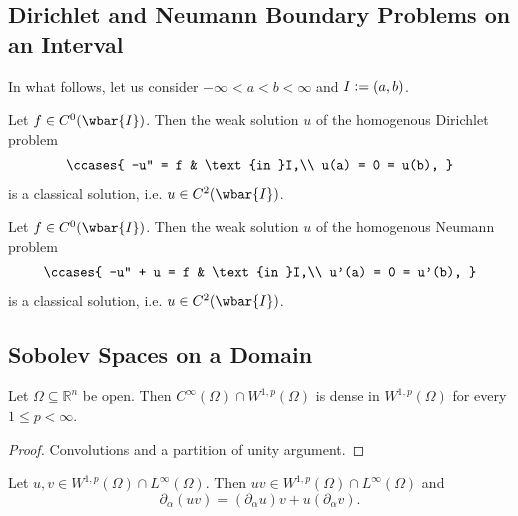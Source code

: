 \subsection*{Dirichlet and Neumann Boundary Problems on an Interval}
In what follows, let us consider $-\infty < a < b < \infty$ and $I := \intoo{a,b}$.

\begin{proposition}
	Let $f \in C^0(\wbar{I})$. Then the weak solution $u$ of the homogenous Dirichlet problem
	\begin{align*}
		\ccases{
			-u'' = f & \text{in }I,\\
			u(a) = 0 = u(b),
		}
	\end{align*}
	\noindent is a classical solution, i.e. $u \in C^2(\wbar{I})$.
\end{proposition}

\begin{proposition}
	Let $f \in C^0(\wbar{I})$. Then the weak solution $u$ of the homogenous Neumann problem
	\begin{align*}
		\ccases{
			-u'' + u = f & \text{in }I,\\
			u'(a) = 0 = u'(b),
		}
	\end{align*}
	\noindent is a classical solution, i.e. $u \in C^2(\wbar{I})$.
\end{proposition}

\subsection*{Sobolev Spaces on a Domain}

\begin{theorem}
	\label{thm:Meyers-Serrin}
	Let $\Omega \subseteq \mathbb{R}^n$ be open. Then $C^\infty(\Omega) \cap W^{1,p}(\Omega)$ is dense in $W^{1,p}(\Omega)$ for every $1 \leq p < \infty$.
\end{theorem}

\begin{proof}
	Convolutions and a partition of unity argument.
\end{proof}

\begin{proposition}
	Let $u,v \in W^{1,p}(\Omega) \cap L^\infty(\Omega)$. Then $uv \in W^{1,p}(\Omega) \cap L^\infty(\Omega)$ and
	\begin{equation*}
		\partial_\alpha(uv) = (\partial_\alpha u) v + u (\partial_\alpha v).
	\end{equation*}
\end{proposition}


